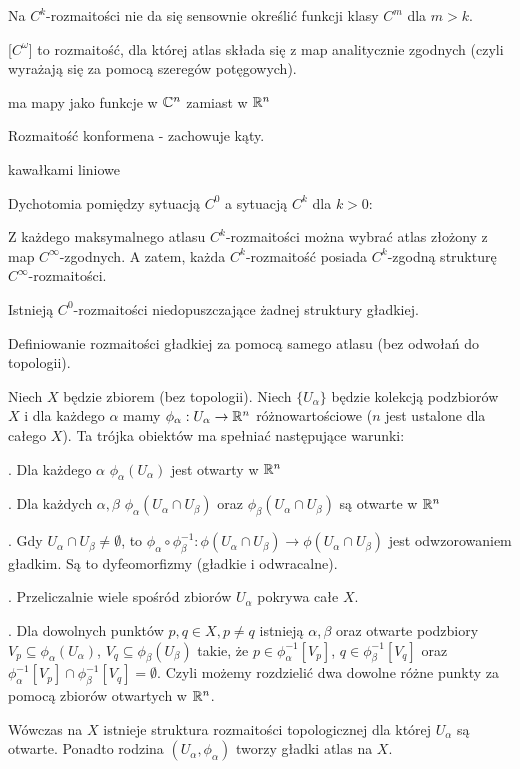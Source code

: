 Na $C^k$-rozmaitości nie da się sensownie określić funkcji klasy $C^m$ dla $m>k$.

 [$C^\omega$] to rozmaitość, dla której atlas składa się z map analitycznie zgodnych (czyli wyrażają się za pomocą szeregów potęgowych).

 ma mapy jako funkcje w $\mathbb{C}^n$ zamiast w $\mathbb{R}^n$

Rozmaitość konformena - zachowuje kąty.

kawałkami liniowe

Dychotomia pomiędzy sytuacją $C^0$ a sytuacją $C^k$ dla $k>0$:

\indent \point Z każdego maksymalnego atlasu $C^k$-rozmaitości można wybrać atlas złożony z map $C^\infty$-zgodnych. A zatem, każda $C^k$-rozmaitość posiada $C^k$-zgodną strukturę $C^\infty$-rozmaitości.

\indent \point Istnieją $C^0$-rozmaitości niedopuszczające żadnej struktury gładkiej.

Definiowanie rozmaitości gładkiej za pomocą samego atlasu (bez odwołań do topologii).

 Niech $X$ będzie zbiorem (bez topologii). Niech $\{U_\alpha\}$ będzie kolekcją podzbiorów $X$ i dla każdego $\alpha$ mamy $\phi_\alpha:U_\alpha\to\mathbb{R}^n$ różnowartościowe ($n$ jest ustalone dla całego $X$). Ta trójka obiektów ma spełniać następujące warunki:

. Dla każdego $\alpha$ $\phi_\alpha(U_\alpha)$ jest otwarty w $\mathbb{R}^n$

. Dla każdych $\alpha,\beta$ $\phi_\alpha(U_\alpha\cap U_\beta)$ oraz $\phi_\beta(U_\alpha\cap U_\beta)$ są otwarte w $\mathbb{R}^n$

. Gdy $U_\alpha\cap U_\beta\neq\emptyset$, to $\phi_\alpha\circ\phi_\beta^{-1}:\phi(U_\alpha\cap U_\beta)\to\phi(U_\alpha\cap U_\beta)$ jest odwzorowaniem gładkim. Są to dyfeomorfizmy (gładkie i odwracalne).

. Przeliczalnie wiele spośród zbiorów $U_\alpha$ pokrywa całe $X$.

. Dla dowolnych punktów $p,q\in X,p\neq q$ istnieją $\alpha,\beta$ oraz otwarte podzbiory $V_p\subseteq\phi_\alpha(U_\alpha)$, $V_q\subseteq\phi_\beta(U_\beta)$ takie, że $p\in\phi_\alpha^{-1}[V_p]$, $q\in\phi_\beta^{-1}[V_q]$ oraz $\phi_\alpha^{-1}[V_p]\cap\phi_\beta^{-1}[V_q]=\emptyset$. Czyli możemy rozdzielić dwa dowolne różne punkty za pomocą zbiorów otwartych w $\mathbb{R}^n$.

Wówczas na $X$ istnieje struktura rozmaitości topologicznej dla której $U_\alpha$ są otwarte. Ponadto rodzina $(U_\alpha,\phi_\alpha)$ tworzy gładki atlas na $X$.

